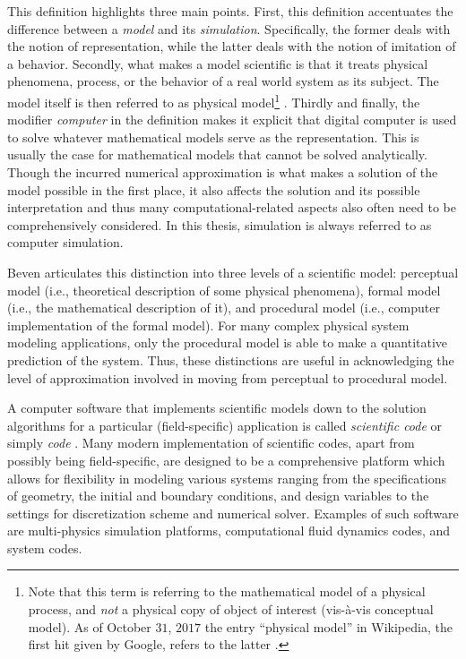 This definition highlights three main points.
First, this definition accentuates the difference between a \emph{model} and its \emph{simulation}.
Specifically, the former deals with the notion of representation, while the latter deals with the notion of imitation of a behavior.
Secondly, what makes a model scientific is that it treats physical phenomena, process, or the behavior of a real world system as its subject.
The model itself is then referred to as physical model\footnote{Note that this term is referring to the mathematical model of a physical process, and \emph{not} a physical copy of object of interest (vis-à-vis conceptual model). As of October $31$, $2017$ the entry ``physical model'' in Wikipedia, the first hit given by Google, refers to the latter \cite{Wikipedia2017}.} .
Thirdly and finally, the modifier \emph{computer} in the definition makes it explicit that digital computer is used to solve whatever mathematical models serve as the representation.
This is usually the case for mathematical models that cannot be solved analytically.
Though the incurred numerical approximation is what makes a solution of the model possible in the first place, 
it also affects the solution and its possible interpretation and thus many computational-related aspects also often need to be comprehensively considered.
In this thesis, simulation is always referred to as computer simulation.

Beven \cite{Beven2009} articulates this distinction into three levels of a scientific model: perceptual model (i.e., theoretical description of some physical phenomena),
formal model (i.e., the mathematical description of it),
and procedural model (i.e., computer implementation of the formal model).
For many complex physical system modeling applications, only the procedural model is able to make a quantitative prediction of the system.
Thus, these distinctions are useful in acknowledging the level of approximation involved in moving from perceptual to procedural model.

A computer software that implements scientific models down to the solution algorithms for a particular (field-specific) application is called \emph{scientific code} or simply \emph{code} \cite{Trucano2006}.
Many modern implementation of scientific codes, apart from possibly being field-specific, are designed to be a comprehensive platform which allows for flexibility in modeling various systems ranging from the specifications of geometry, the initial and boundary conditions, and design variables to the settings for discretization scheme and numerical solver.
Examples of such software are multi-physics simulation platforms, computational fluid dynamics codes, and  system codes.

